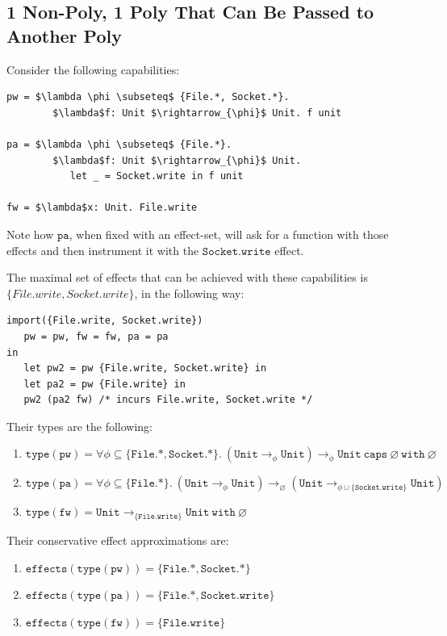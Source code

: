 \documentclass{llncs}
\newcommand{\keywadj}[1]{\mathtt{#1}}
\newcommand{\kwa}[1]{\keywadj{ #1 }}
\begin{document}
\subsection{1 Non-Poly, 1 Poly That Can Be Passed to Another Poly}

Consider the following capabilities:

\begin{lstlisting}
pw = $\lambda \phi \subseteq$ {File.*, Socket.*}.
        $\lambda$f: Unit $\rightarrow_{\phi}$ Unit. f unit

pa = $\lambda \phi \subseteq$ {File.*}.
        $\lambda$f: Unit $\rightarrow_{\phi}$ Unit.
           let _ = Socket.write in f unit

fw = $\lambda$x: Unit. File.write
\end{lstlisting}

\noindent
Note how $\kwa{pa}$, when fixed with an effect-set, will ask for a function with those effects and then instrument it with the $\kwa{Socket.write}$ effect.

The maximal set of effects that can be achieved with these capabilities is $\{ File.write, Socket.write \}$, in the following way:

\begin{lstlisting}
import({File.write, Socket.write})
   pw = pw, fw = fw, pa = pa
in
   let pw2 = pw {File.write, Socket.write} in
   let pa2 = pw {File.write} in
   pw2 (pa2 fw) /* incurs File.write, Socket.write */
\end{lstlisting}

\noindent
Their types are the following:

\begin{enumerate}
	\item $\kwa{type(pw) = \forall \phi \subseteq \{ File.*, Socket.* \}.~(Unit \rightarrow_{\phi} Unit) \rightarrow_{\phi} Unit~caps~\varnothing~with~\varnothing}$ 
	\item $\kwa{type(pa) = \forall \phi \subseteq \{ File.* \}.~(Unit \rightarrow_{\phi} Unit) \rightarrow_{\varnothing} (Unit \rightarrow_{\phi \cup \{Socket.write\}} Unit)}$
	\item $\kwa{type(fw) = Unit \rightarrow_{\{File.write\}} Unit~with~\varnothing}$
\end{enumerate}

\noindent
Their conservative effect approximations are:

\begin{enumerate}
	\item $\kwa{effects(type(pw)) = \{File.*, Socket.* \} }$
	\item $\kwa{effects(type(pa)) = \{File.*, Socket.write \}}$
	\item $\kwa{effects(type(fw)) = \{File.write\} }$
\end{enumerate}
\end{document}
